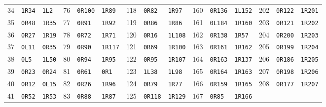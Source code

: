 \begin{center}
\begin{tabular}{rll@{\qquad}rll@{\qquad}rll@{\qquad}rll@{\qquad}rll}
34 & \texttt{1R34} & \texttt{1L2} & 76 & \texttt{0R100} & \texttt{1R89} & 118 & \texttt{0R82} & \texttt{1R97} & 160 & \texttt{0R136} & \texttt{1L152} & 202 & \texttt{0R122} & \texttt{1R201} \\
35 & \texttt{0R48} & \texttt{1R35} & 77 & \texttt{0R91} & \texttt{1R92} & 119 & \texttt{0R86} & \texttt{1R86} & 161 & \texttt{0L184} & \texttt{1R160} & 203 & \texttt{0R121} & \texttt{1R202} \\
36 & \texttt{0R27} & \texttt{1R19} & 78 & \texttt{0R72} & \texttt{1R71} & 120 & \texttt{0R16} & \texttt{1L108} & 162 & \texttt{0R138} & \texttt{1R57} & 204 & \texttt{0R200} & \texttt{1R203} \\
37 & \texttt{0L11} & \texttt{0R35} & 79 & \texttt{0R90} & \texttt{1R117} & 121 & \texttt{0R69} & \texttt{1R100} & 163 & \texttt{0R161} & \texttt{1R162} & 205 & \texttt{0R199} & \texttt{1R204} \\
38 & \texttt{0L5} & \texttt{1L50} & 80 & \texttt{0R94} & \texttt{1R95} & 122 & \texttt{0R95} & \texttt{1R107} & 164 & \texttt{0R163} & \texttt{1R137} & 206 & \texttt{0R186} & \texttt{1R205} \\
39 & \texttt{0R23} & \texttt{0R24} & 81 & \texttt{0R61} & \texttt{0R1} & 123 & \texttt{1L38} & \texttt{1L98} & 165 & \texttt{0R164} & \texttt{1R163} & 207 & \texttt{0R198} & \texttt{1R206} \\
40 & \texttt{0R12} & \texttt{0L15} & 82 & \texttt{0R26} & \texttt{1R96} & 124 & \texttt{0R79} & \texttt{1R77} & 166 & \texttt{0R159} & \texttt{1R165} & 208 & \texttt{0R177} & \texttt{1R207} \\
41 & \texttt{0R52} & \texttt{1R53} & 83 & \texttt{0R88} & \texttt{1R87} & 125 & \texttt{0R118} & \texttt{1R129} & 167 & \texttt{0R85} & \texttt{1R166} &  &  &  \\
\bottomrule
\end{tabular}
\end{center}
